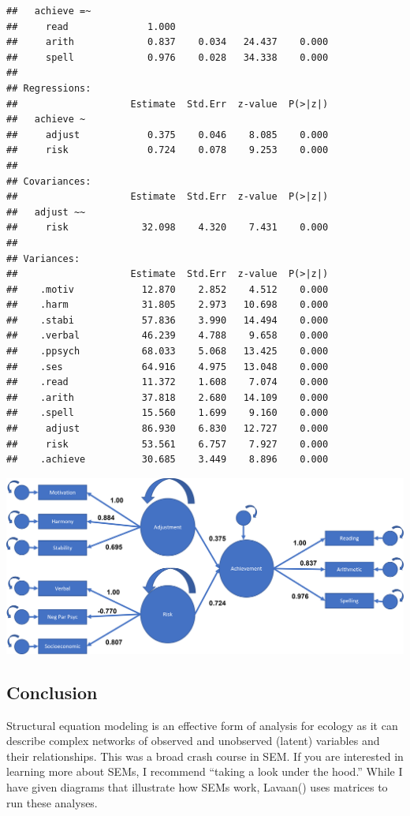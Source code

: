 \documentclass[
]{article}
\begin{document}
\begin{verbatim}
##   achieve =~                                          
##     read              1.000                           
##     arith             0.837    0.034   24.437    0.000
##     spell             0.976    0.028   34.338    0.000
## 
## Regressions:
##                    Estimate  Std.Err  z-value  P(>|z|)
##   achieve ~                                           
##     adjust            0.375    0.046    8.085    0.000
##     risk              0.724    0.078    9.253    0.000
## 
## Covariances:
##                    Estimate  Std.Err  z-value  P(>|z|)
##   adjust ~~                                           
##     risk             32.098    4.320    7.431    0.000
## 
## Variances:
##                    Estimate  Std.Err  z-value  P(>|z|)
##    .motiv            12.870    2.852    4.512    0.000
##    .harm             31.805    2.973   10.698    0.000
##    .stabi            57.836    3.990   14.494    0.000
##    .verbal           46.239    4.788    9.658    0.000
##    .ppsych           68.033    5.068   13.425    0.000
##    .ses              64.916    4.975   13.048    0.000
##    .read             11.372    1.608    7.074    0.000
##    .arith            37.818    2.680   14.109    0.000
##    .spell            15.560    1.699    9.160    0.000
##     adjust           86.930    6.830   12.727    0.000
##     risk             53.561    6.757    7.927    0.000
##    .achieve          30.685    3.449    8.896    0.000
\end{verbatim}

\includegraphics{StrRegLablCoef.PNG}

\hypertarget{conclusion}{%
\subsection{Conclusion}\label{conclusion}}

Structural equation modeling is an effective form of analysis for
ecology as it can describe complex networks of observed and unobserved
(latent) variables and their relationships. This was a broad crash
course in SEM. If you are interested in learning more about SEMs, I
recommend ``taking a look under the hood.'' While I have given diagrams
that illustrate how SEMs work, Lavaan() uses matrices to run these
analyses.
\end{document}
